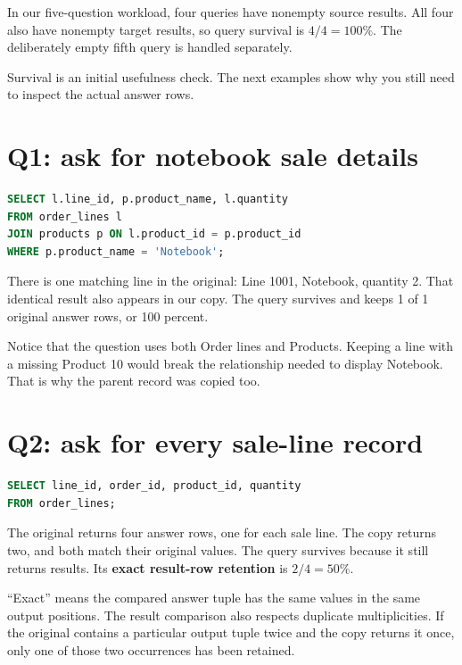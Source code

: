 \documentclass[12pt,a4paper,oneside]{report}
\begin{document}
In our five-question workload, four queries have nonempty source results. All four also have nonempty target results, so query survival is $4/4=100\%$. The deliberately empty fifth query is handled separately.

Survival is an initial usefulness check. The next examples show why you still need to inspect the actual answer rows.

\section{Q1: ask for notebook sale details}
\begin{lstlisting}[language=SQL]
SELECT l.line_id, p.product_name, l.quantity
FROM order_lines l
JOIN products p ON l.product_id = p.product_id
WHERE p.product_name = 'Notebook';
\end{lstlisting}
There is one matching line in the original: Line 1001, Notebook, quantity 2. That identical result also appears in our copy. The query survives and keeps 1 of 1 original answer rows, or 100 percent.

Notice that the question uses both Order lines and Products. Keeping a line with a missing Product 10 would break the relationship needed to display Notebook. That is why the parent record was copied too.

\section{Q2: ask for every sale-line record}
\begin{lstlisting}[language=SQL]
SELECT line_id, order_id, product_id, quantity
FROM order_lines;
\end{lstlisting}
The original returns four answer rows, one for each sale line. The copy returns two, and both match their original values. The query survives because it still returns results. Its \textbf{exact result-row retention} is $2/4=50\%$.

``Exact'' means the compared answer tuple has the same values in the same output positions. The result comparison also respects duplicate multiplicities. If the original contains a particular output tuple twice and the copy returns it once, only one of those two occurrences has been retained.
\end{document}

